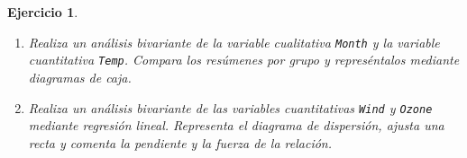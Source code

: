 \documentclass[11pt,a4paper]{article}
\theoremstyle{exercise}
\newtheorem{exercise}{Ejercicio}
\begin{document}
\begin{exercise}
\begin{enumerate}
	\item Realiza un análisis bivariante de la variable cualitativa \texttt{Month} y la variable cuantitativa \texttt{Temp}. Compara los resúmenes por grupo y represéntalos mediante diagramas de caja.

	\item Realiza un análisis bivariante de las variables cuantitativas \texttt{Wind} y \texttt{Ozone} mediante regresión lineal. Representa el diagrama de dispersión, ajusta una recta y comenta la pendiente y la fuerza de la relación.
	\end{enumerate}
\end{exercise}
\end{document}
